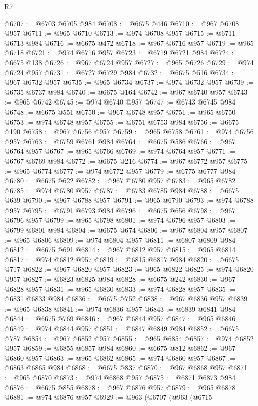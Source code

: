 \begin{lexlean}{R7}
\begin{coremodule}
@6707 := @6703 @6705 @984
@6708 := @6675 @446
@6710 := @967 @6708 @957
@6711 := @965 @6710
@6713 := @974 @6708 @957
@6715 := @6711 @6713 @984
@6716 := @6675 @472
@6718 := @967 @6716 @957
@6719 := @965 @6718
@6721 := @974 @6716 @957
@6723 := @6719 @6721 @984
@6724 := @6675 @138
@6726 := @967 @6724 @957
@6727 := @965 @6726
@6729 := @974 @6724 @957
@6731 := @6727 @6729 @984
@6732 := @6675 @516
@6734 := @967 @6732 @957
@6735 := @965 @6734
@6737 := @974 @6732 @957
@6739 := @6735 @6737 @984
@6740 := @6675 @164
@6742 := @967 @6740 @957
@6743 := @965 @6742
@6745 := @974 @6740 @957
@6747 := @6743 @6745 @984
@6748 := @6675 @551
@6750 := @967 @6748 @957
@6751 := @965 @6750
@6753 := @974 @6748 @957
@6755 := @6751 @6753 @984
@6756 := @6675 @190
@6758 := @967 @6756 @957
@6759 := @965 @6758
@6761 := @974 @6756 @957
@6763 := @6759 @6761 @984
@6764 := @6675 @586
@6766 := @967 @6764 @957
@6767 := @965 @6766
@6769 := @974 @6764 @957
@6771 := @6767 @6769 @984
@6772 := @6675 @216
@6774 := @967 @6772 @957
@6775 := @965 @6774
@6777 := @974 @6772 @957
@6779 := @6775 @6777 @984
@6780 := @6675 @622
@6782 := @967 @6780 @957
@6783 := @965 @6782
@6785 := @974 @6780 @957
@6787 := @6783 @6785 @984
@6788 := @6675 @639
@6790 := @967 @6788 @957
@6791 := @965 @6790
@6793 := @974 @6788 @957
@6795 := @6791 @6793 @984
@6796 := @6675 @656
@6798 := @967 @6796 @957
@6799 := @965 @6798
@6801 := @974 @6796 @957
@6803 := @6799 @6801 @984
@6804 := @6675 @674
@6806 := @967 @6804 @957
@6807 := @965 @6806
@6809 := @974 @6804 @957
@6811 := @6807 @6809 @984
@6812 := @6675 @691
@6814 := @967 @6812 @957
@6815 := @965 @6814
@6817 := @974 @6812 @957
@6819 := @6815 @6817 @984
@6820 := @6675 @717
@6822 := @967 @6820 @957
@6823 := @965 @6822
@6825 := @974 @6820 @957
@6827 := @6823 @6825 @984
@6828 := @6675 @242
@6830 := @967 @6828 @957
@6831 := @965 @6830
@6833 := @974 @6828 @957
@6835 := @6831 @6833 @984
@6836 := @6675 @752
@6838 := @967 @6836 @957
@6839 := @965 @6838
@6841 := @974 @6836 @957
@6843 := @6839 @6841 @984
@6844 := @6675 @769
@6846 := @967 @6844 @957
@6847 := @965 @6846
@6849 := @974 @6844 @957
@6851 := @6847 @6849 @984
@6852 := @6675 @787
@6854 := @967 @6852 @957
@6855 := @965 @6854
@6857 := @974 @6852 @957
@6859 := @6855 @6857 @984
@6860 := @6675 @812
@6862 := @967 @6860 @957
@6863 := @965 @6862
@6865 := @974 @6860 @957
@6867 := @6863 @6865 @984
@6868 := @6675 @837
@6870 := @967 @6868 @957
@6871 := @965 @6870
@6873 := @974 @6868 @957
@6875 := @6871 @6873 @984
@6876 := @6675 @855
@6878 := @967 @6876 @957
@6879 := @965 @6878
@6881 := @974 @6876 @957
@6929 := @963
    (@6707
      (@963
        (@6715

\end{coremodule}
\end{lexlean}
